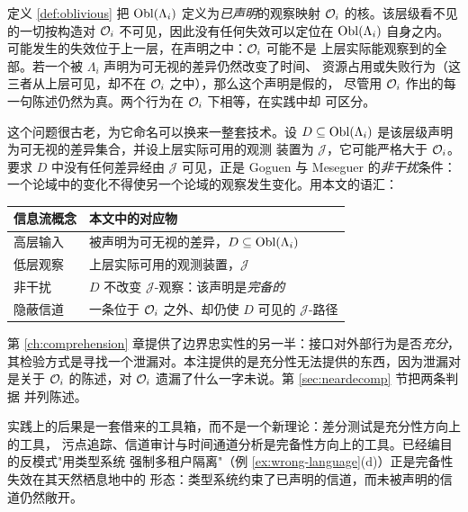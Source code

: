 \begin{remark}\label{rmk:noninterference}
定义 \ref{def:oblivious} 把 $\operatorname{Obl}(\Lambda_i)$ 定义为\emph{已声明}的观察映射 $\mathcal{O}_i$
的核。该层级看不见的一切按构造对 $\mathcal{O}_i$ 不可见，因此没有任何失效可以定位在
$\operatorname{Obl}(\Lambda_i)$ 自身之内。可能发生的失效位于上一层，在声明之中：$\mathcal{O}_i$ 可能不是
上层实际能观察到的全部。若一个被 $\Lambda_i$ 声明为可无视的差异仍然改变了时间、
资源占用或失败行为（这三者从上层可见，却不在 $\mathcal{O}_i$ 之中），那么这个声明是假的，
尽管用 $\mathcal{O}_i$ 作出的每一句陈述仍然为真。两个行为在 $\mathcal{O}_i$ 下相等，在实践中却
可区分。

这个问题很古老，为它命名可以换来一整套技术。设
$D \subseteq \operatorname{Obl}(\Lambda_i)$ 是该层级声明为可无视的差异集合，并设上层实际可用的观测
装置为 $\mathcal{J}$，它可能严格大于 $\mathcal{O}_i$。要求 $D$ 中没有任何差异经由
$\mathcal{J}$ 可见，正是 Goguen 与 Meseguer 的\emph{非干扰}条件\cite{goguen1982}：
一个论域中的变化不得使另一个论域的观察发生变化。用本文的语汇：

\begin{center}
\small
\begin{tabular}{L{4.2cm}L{10.0cm}}
\toprule
\textbf{信息流概念} & \textbf{本文中的对应物} \\
\midrule
高层输入 & 被声明为可无视的差异，$D \subseteq \operatorname{Obl}(\Lambda_i)$ \\
低层观察 & 上层实际可用的观测装置，$\mathcal{J}$ \\
非干扰 & $D$ 不改变 $\mathcal{J}$-观察：该声明是\emph{完备的} \\
隐蔽信道 & 一条位于 $\mathcal{O}_i$ 之外、却仍使 $D$ 可见的 $\mathcal{J}$-路径 \\
\bottomrule
\end{tabular}
\end{center}

第 \ref{ch:comprehension} 章提供了边界忠实性的另一半：接口对外部行为是否\emph{充分}，
其检验方式是寻找一个泄漏对。本注提供的是充分性无法提供的东西，因为泄漏对是关于
$\mathcal{O}_i$ 的陈述，对 $\mathcal{O}_i$ 遗漏了什么一字未说。第 \ref{sec:neardecomp} 节把两条判据
并列陈述。

实践上的后果是一套借来的工具箱，而不是一个新理论：差分测试是充分性方向上的工具，
污点追踪、信道审计与时间通道分析是完备性方向上的工具。已经编目的反模式"用类型系统
强制多租户隔离"（例 \ref{ex:wrong-language}(d)）正是完备性失效在其天然栖息地中的
形态：类型系统约束了已声明的信道，而未被声明的信道仍然敞开。
\end{remark}

